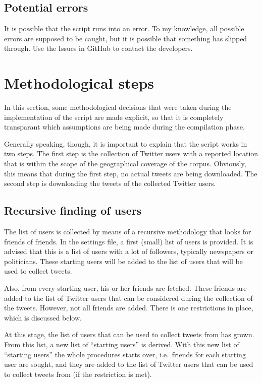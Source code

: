 \documentclass[a4paper,11pt]{article}
\begin{document}
\subsection{Potential errors}

It is possible that the script runs into an error. To my knowledge, all possible errors are supposed to be caught, but it is possible that something has slipped through. Use the Issues in GitHub to contact the developers.

\section{Methodological steps}

In this section, some methodological decisions that were taken during the implementation of the script are made explicit, so that it is completely transparant which assumptions are being made during the compilation phase.

Generally speaking, though, it is important to explain that the script works in two steps. The first step is the collection of Twitter users with a reported location that is within the scope of the geographical coverage of the corpus. Obviously, this means that during the first step, no actual tweets are being downloaded. The second step is downloading the tweets of the collected Twitter users.

\subsection{Recursive finding of users}

The list of users is collected by means of a recursive methodology that looks for friends of friends. In the settings file, a first (small) list of users is provided. It is advised that this is a list of users with a lot of followers, typically newspapers or politicians. These starting users will be added to the list of users that will be used to collect tweets.

Also, from every starting user, his or her friends are fetched. These friends are added to the list of Twitter users that can be considered during the collection of the tweets. However, not all friends are added. There is one restrictions in place, which is discussed below.

At this stage, the list of users that can be used to collect tweets from has grown. From this list, a new list of ``starting users'' is derived. With this new list of ``starting users'' the whole procedures starts over, i.e.~friends for each starting user are sought, and they are added to the list of Twitter users that can be used to collect tweets from (if the restriction is met).
\end{document}
